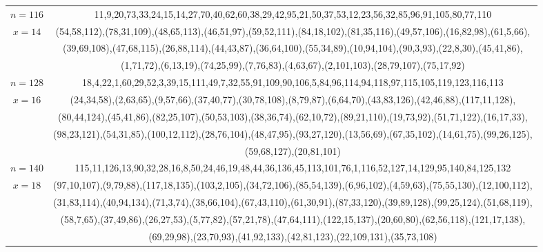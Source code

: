 \begin{tabular}{| c | c |}
\(n=116\) & 
11,9,20,73,33,24,15,14,27,70,40,62,60,38,29,42,95,21,50,37,53,12,23,56,32,85,96,91,105,80,77,110\\
\cline{2-2}
\(x=14\)
&(54,58,112),(78,31,109),(48,65,113),(46,51,97),(59,52,111),(84,18,102),(81,35,116),(49,57,106),(16,82,98),(61,5,66),\\
&(39,69,108),(47,68,115),(26,88,114),(44,43,87),(36,64,100),(55,34,89),(10,94,104),(90,3,93),(22,8,30),(45,41,86),\\
&(1,71,72),(6,13,19),(74,25,99),(7,76,83),(4,63,67),(2,101,103),(28,79,107),(75,17,92)\\
\hline 
\(n=128\) & 
18,4,22,1,60,29,52,3,39,15,111,49,7,32,55,91,109,90,106,5,84,96,114,94,118,97,115,105,119,123,116,113\\
\cline{2-2}
\(x=16\)
&(24,34,58),(2,63,65),(9,57,66),(37,40,77),(30,78,108),(8,79,87),(6,64,70),(43,83,126),(42,46,88),(117,11,128),\\
&(80,44,124),(45,41,86),(82,25,107),(50,53,103),(38,36,74),(62,10,72),(89,21,110),(19,73,92),(51,71,122),(16,17,33),\\
&(98,23,121),(54,31,85),(100,12,112),(28,76,104),(48,47,95),(93,27,120),(13,56,69),(67,35,102),(14,61,75),(99,26,125),\\
&(59,68,127),(20,81,101)\\
\hline 
\(n=140\) & 
115,11,126,13,90,32,28,16,8,50,24,46,19,48,44,36,136,45,113,101,76,1,116,52,127,14,129,95,140,84,125,132\\
\cline{2-2}
\(x=18\)
&(97,10,107),(9,79,88),(117,18,135),(103,2,105),(34,72,106),(85,54,139),(6,96,102),(4,59,63),(75,55,130),(12,100,112),\\
&(31,83,114),(40,94,134),(71,3,74),(38,66,104),(67,43,110),(61,30,91),(87,33,120),(39,89,128),(99,25,124),(51,68,119),\\
&(58,7,65),(37,49,86),(26,27,53),(5,77,82),(57,21,78),(47,64,111),(122,15,137),(20,60,80),(62,56,118),(121,17,138),\\
&(69,29,98),(23,70,93),(41,92,133),(42,81,123),(22,109,131),(35,73,108)\\
\hline 
\end{tabular}